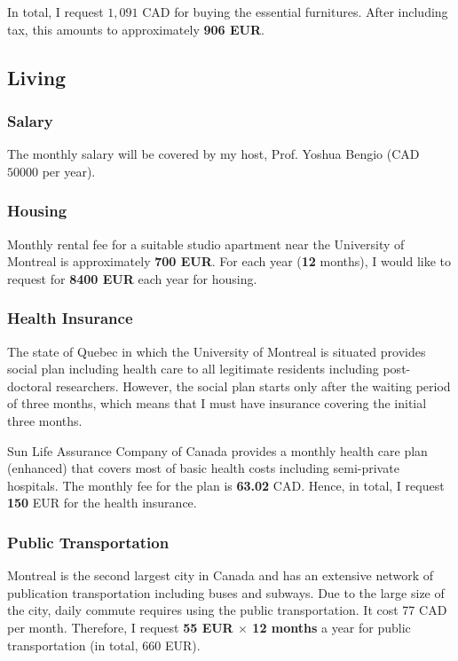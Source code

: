 \documentclass[11pt, oneside]{essay}
\begin{document}
In total, I request $1,091$ CAD for buying the essential
furnitures. After including tax, this amounts to approximately
\textbf{906 EUR}.


\subsection{Living}

\subsubsection{Salary}

The monthly salary will be covered by my
host, Prof. Yoshua Bengio (CAD $50000$ per year).

\subsubsection{Housing}

Monthly rental fee for a suitable studio apartment near the
University of Montreal is approximately \textbf{700 EUR}. For
each year (\textbf{12} months), I would like to request for
\textbf{8400 EUR} each year for housing.

\subsubsection{Health Insurance}

The state of Quebec in which the University of Montreal is
situated provides social plan including health care to
all legitimate residents including post-doctoral researchers.
However, the social plan starts only after the waiting period of
three months, which means that I must have insurance
covering the initial three months. 

Sun Life Assurance Company of Canada provides a monthly health
care plan (enhanced) that covers most of basic health costs including
semi-private hospitals. The monthly fee for the plan is
\textbf{63.02} CAD. Hence, in total, I request \textbf{150} EUR
for the health insurance.



\subsubsection{Public Transportation}

Montreal is the second largest city in Canada and has an
extensive network of publication transportation including buses
and subways. Due to the large size of the city, daily commute
requires using the public transportation. It cost 77 CAD per
month. Therefore, I request \textbf{55 EUR $\times$ 12 months} a
year for public transportation (in total, 660 EUR).








%
%
\end{document}
